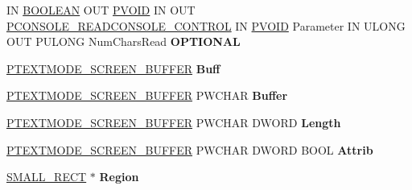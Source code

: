 \begin{DoxyCompactItemize}
\item 
\mbox{\label{struct___t_e_r_m_i_n_a_l___v_t_b_l_a3b0b069e93e5352e447217a1c179b6a9}} 
IN \hyperlink{_processor_bind_8h_a112e3146cb38b6ee95e64d85842e380a}{B\+O\+O\+L\+E\+AN} O\+UT \hyperlink{interfacevoid}{P\+V\+O\+ID} IN O\+UT \hyperlink{struct___c_o_n_s_o_l_e___r_e_a_d_c_o_n_s_o_l_e___c_o_n_t_r_o_l}{P\+C\+O\+N\+S\+O\+L\+E\+\_\+\+R\+E\+A\+D\+C\+O\+N\+S\+O\+L\+E\+\_\+\+C\+O\+N\+T\+R\+OL} IN \hyperlink{interfacevoid}{P\+V\+O\+ID} Parameter IN U\+L\+O\+NG O\+UT P\+U\+L\+O\+NG Num\+Chars\+Read {\bfseries O\+P\+T\+I\+O\+N\+AL}
\item 
\mbox{\label{struct___t_e_r_m_i_n_a_l___v_t_b_l_a31d8dc296349c62f19ae4bfa7dde44da}} 
\hyperlink{struct___t_e_x_t_m_o_d_e___s_c_r_e_e_n___b_u_f_f_e_r}{P\+T\+E\+X\+T\+M\+O\+D\+E\+\_\+\+S\+C\+R\+E\+E\+N\+\_\+\+B\+U\+F\+F\+ER} {\bfseries Buff}
\item 
\mbox{\label{struct___t_e_r_m_i_n_a_l___v_t_b_l_a918568f670d4996537c9efddf11f40ea}} 
\hyperlink{struct___t_e_x_t_m_o_d_e___s_c_r_e_e_n___b_u_f_f_e_r}{P\+T\+E\+X\+T\+M\+O\+D\+E\+\_\+\+S\+C\+R\+E\+E\+N\+\_\+\+B\+U\+F\+F\+ER} P\+W\+C\+H\+AR {\bfseries Buffer}
\item 
\mbox{\label{struct___t_e_r_m_i_n_a_l___v_t_b_l_afa8711de1c15d37edeb0d01a29fb43b1}} 
\hyperlink{struct___t_e_x_t_m_o_d_e___s_c_r_e_e_n___b_u_f_f_e_r}{P\+T\+E\+X\+T\+M\+O\+D\+E\+\_\+\+S\+C\+R\+E\+E\+N\+\_\+\+B\+U\+F\+F\+ER} P\+W\+C\+H\+AR D\+W\+O\+RD {\bfseries Length}
\item 
\mbox{\label{struct___t_e_r_m_i_n_a_l___v_t_b_l_a8fccd5e5258d4d9342a18f52d9d730cb}} 
\hyperlink{struct___t_e_x_t_m_o_d_e___s_c_r_e_e_n___b_u_f_f_e_r}{P\+T\+E\+X\+T\+M\+O\+D\+E\+\_\+\+S\+C\+R\+E\+E\+N\+\_\+\+B\+U\+F\+F\+ER} P\+W\+C\+H\+AR D\+W\+O\+RD B\+O\+OL {\bfseries Attrib}
\item 
\mbox{\label{struct___t_e_r_m_i_n_a_l___v_t_b_l_aec852eba4b608e8ee98efcd4b71895fb}} 
\hyperlink{structtag_s_m_a_l_l___r_e_c_t}{S\+M\+A\+L\+L\+\_\+\+R\+E\+CT} $\ast$ {\bfseries Region}
\item 
\mbox{\label{struct___t_e_r_m_i_n_a_l___v_t_b_l_a8ac9766794e5067f02fc00d73f76fb6a}} 

\end{DoxyCompactItemize}
